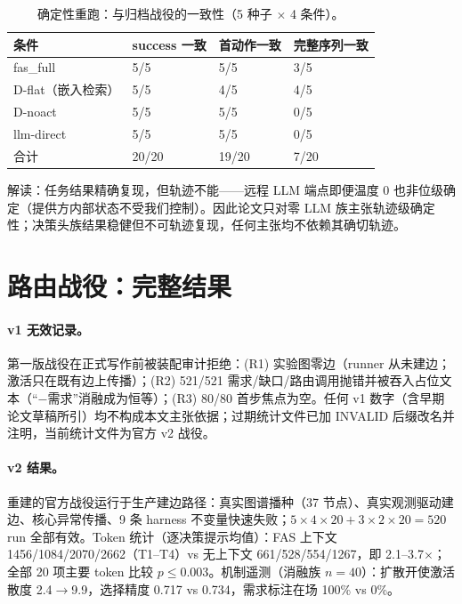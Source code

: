 \documentclass[10pt,a4paper]{ctexart}
\begin{document}
\begin{table}[h]
\centering\small
\caption{确定性重跑：与归档战役的一致性（5 种子 $\times$ 4 条件）。}
\label{tab:s-rerun}
\begin{tabular}{L{3.2cm}L{3.6cm}L{3.6cm}L{3.6cm}}
\toprule
\textbf{条件} & \textbf{success 一致} & \textbf{首动作一致} & \textbf{完整序列一致} \\
\midrule
fas\_full & 5/5 & 5/5 & 3/5 \\
D-flat（嵌入检索） & 5/5 & 4/5 & 4/5 \\
D-noact & 5/5 & 5/5 & 0/5 \\
llm-direct & 5/5 & 5/5 & 0/5 \\
\midrule
合计 & 20/20 & 19/20 & 7/20 \\
\bottomrule
\end{tabular}
\end{table}

解读：任务结果精确复现，但轨迹不能——远程 LLM 端点即便温度 0 也非位级确定（提供方内部状态不受我们控制）。因此论文只对零 LLM 族主张轨迹级确定性；决策头族结果稳健但不可轨迹复现，任何主张均不依赖其确切轨迹。

\section{路由战役：完整结果}
\label{s11:routing}

\paragraph{v1 无效记录。}第一版战役在正式写作前被装配审计拒绝：(R1) 实验图零边（runner 从未建边；激活只在既有边上传播）；(R2) 521/521 需求/缺口/路由调用抛错并被吞入占位文本（“$-$需求”消融成为恒等）；(R3) 80/80 首步焦点为空。任何 v1 数字（含早期论文草稿所引）均不构成本文主张依据；过期统计文件已加 INVALID 后缀改名并注明，当前统计文件为官方 v2 战役。

\paragraph{v2 结果。}重建的官方战役运行于生产建边路径：真实图谱播种（37 节点）、真实观测驱动建边、核心异常传播、9 条 harness 不变量快速失败；$5\times4\times20+3\times2\times20=520$ run 全部有效。Token 统计（逐决策提示均值）：FAS 上下文 1456/1084/2070/2662（T1--T4）vs 无上下文 661/528/554/1267，即 2.1--3.7$\times$；全部 20 项主要 token 比较 $p\le0.003$。机制遥测（消融族 $n{=}40$）：扩散开使激活散度 2.4$\rightarrow$9.9，选择精度 0.717 vs 0.734，需求标注在场 100\% vs 0\%。
\end{document}
